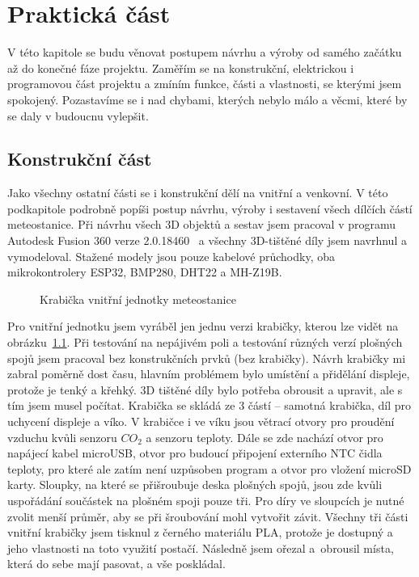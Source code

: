 \chapter{Praktická část}
    V této kapitole se budu věnovat postupem návrhu a výroby od samého začátku až do konečné fáze projektu. Zaměřím se na konstrukční, elektrickou i programovou část projektu a zmíním funkce, části a vlastnosti, se kterými jsem spokojený. Pozastavíme se i nad chybami, kterých nebylo málo a věcmi, které by se daly v budoucnu vylepšit.

    \section{Konstrukční část} \label{KonstCast}
        Jako všechny ostatní části se i konstrukční dělí na vnitřní a venkovní. V této podkapitole podrobně popíši postup návrhu, výroby i sestavení všech dílčích částí meteostanice. Při návrhu všech 3D objektů a sestav jsem pracoval v programu Autodesk Fusion 360 verze 2.0.18460~\cite{AutodeskFusion360} a všechny 3D-tištěné díly jsem navrhnul a vymodeloval. Stažené modely jsou pouze kabelové průchodky, oba mikrokontrolery ESP32, BMP280, DHT22 a MH-Z19B.

        \begin{figure}[htb]
        \caption{Krabička vnitřní jednotky meteostanice}
        \label{Krab}
        \end{figure}

        Pro vnitřní jednotku jsem vyráběl jen jednu verzi krabičky, kterou lze vidět na obrázku~\ref{Krab}. Při testování na nepájivém poli a testování různých verzí plošných spojů jsem pracoval bez konstrukčních prvků (bez krabičky). Návrh krabičky mi zabral poměrně dost času, hlavním problémem bylo umístění a přidělání displeje, protože je tenký a křehký. 3D tištěné díly bylo potřeba obrousit a upravit, ale s tím jsem musel počítat. Krabička se skládá ze 3 částí – samotná krabička, díl pro uchycení displeje a víko. V krabičce i ve víku jsou větrací otvory pro proudění vzduchu kvůli senzoru $CO_2$ a senzoru teploty. Dále se zde nachází otvor pro napájecí kabel microUSB, otvor pro budoucí připojení externího NTC čidla teploty, pro které ale zatím není uzpůsoben program a otvor pro vložení microSD karty. Sloupky, na které se přišroubuje deska plošných spojů, jsou zde kvůli uspořádání součástek na plošném spoji pouze tři. Pro díry ve sloupcích je nutné zvolit menší průměr, aby se při šroubování mohl vytvořit závit. Všechny tři části vnitřní krabičky jsem tisknul z černého materiálu PLA, protože je dostupný a jeho vlastnosti na toto využití postačí. Následně jsem ořezal a~obrousil místa, která do sebe mají pasovat, a vše poskládal.

